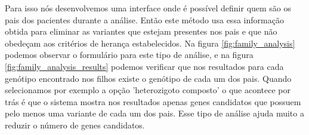 Para isso nós desenvolvemos uma interface onde é possível definir quem são os pais dos pacientes durante a análise. Então este método usa essa informação obtida para eliminar as variantes que estejam presentes nos pais e que não obedeçam aos critérios de herança estabelecidos. Na figura \ref{fig:family_analysis} podemos observar o formulário para este tipo de análise, e na figura \ref{fig:family_analysis_results} podemos verificar que nos resultados para cada genótipo encontrado nos filhos existe o genótipo de cada um dos pais. Quando selecionamos por exemplo a opção 'heterozigoto composto' o que acontece por trás é que o sistema mostra nos resultados apenas genes candidatos que possuem pelo menos uma variante de cada um dos pais. Esse tipo de análise ajuda muito a reduzir o número de genes candidatos.






